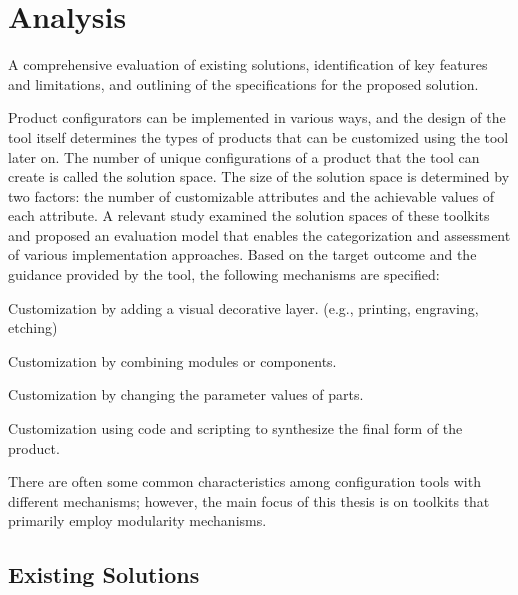 \chapter{Analysis}

\begin{chapterabstract}
A comprehensive evaluation of existing solutions, identification of key features and limitations, and outlining of the specifications for the proposed solution.
\end{chapterabstract}

Product configurators can be implemented in various ways, and the design of the tool itself determines the types of products that can be customized using the tool later on. The number of unique configurations of a product that the tool can create is called the solution space. The size of the solution space is determined by two factors: the number of customizable attributes and the achievable values of each attribute. \cite{Huiwen2018} A relevant study examined the solution spaces of these toolkits and proposed an evaluation model that enables the categorization and assessment of various implementation approaches. Based on the target outcome and the guidance provided by the tool, the following mechanisms are specified: \cite{Hermans2012}

\begin{definition}[Veneer]
Customization by adding a visual decorative layer. (e.g., printing, engraving, etching)
\end{definition}
\begin{definition}[Modularity]
Customization by combining modules or components.
\end{definition}
\begin{definition}[Parametric]
Customization by changing the parameter values of parts.
\end{definition}
\begin{definition}[Generative]
Customization using code and scripting to synthesize the final form of the product.
\end{definition}

There are often some common characteristics among configuration tools with different mechanisms; however, the main focus of this thesis is on toolkits that primarily employ modularity mechanisms.


\section{Existing Solutions}
